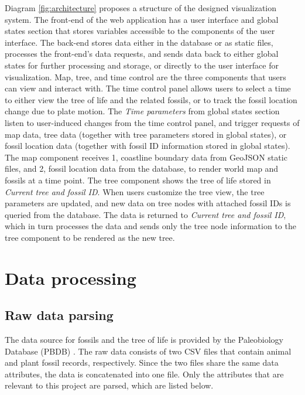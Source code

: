 \documentclass[11pt, a4paper,oneside,chapterprefix=false]{scrbook}
\begin{document}
Diagram \ref{fig:architecture} proposes a structure of the designed visualization system. The front-end of the web application has a user interface and global states section that stores variables accessible to the components of the user interface. The back-end stores data either in the database or as static files, processes the front-end's data requests, and sends data back to either global states for further processing and storage, or directly to the user interface for visualization. Map, tree, and time control are the three components that users can view and interact with. The time control panel allows users to select a time to either view the tree of life and the related fossils, or to track the fossil location change due to plate motion. The \emph{Time parameters} from global states section listen to user-induced changes from the time control panel, and trigger requests of map data, tree data (together with tree parameters stored in global states), or fossil location data (together with fossil ID information stored in global states). The map component receives 1, coastline boundary data from GeoJSON static files, and 2, fossil location data from the database, to render world map and fossils at a time point. The tree component shows the tree of life stored in \emph{Current tree and fossil ID}. When users customize the tree view, the tree parameters are updated, and new data on tree nodes with attached fossil IDs is queried from the database. The data is returned to \emph{Current tree and fossil ID}, which in turn processes the data and sends only the tree node information to the tree component to be rendered as the new tree. 

\section{Data processing} \label{sec:tec_data_processing}
\subsection{Raw data parsing} \label{subsec:raw_data_parsing}
The data source for fossils and the tree of life is provided by the Paleobiology Database (PBDB) \cite{peters2016paleobiology}. The raw data consists of two CSV files that contain animal and plant fossil records, respectively. Since the two files share the same data attributes, the data is concatenated into one file. Only the attributes that are relevant to this project are parsed, which are listed below.\\
\end{document}
